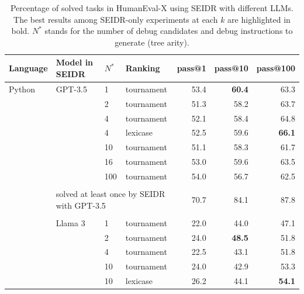 \begin{table}[t]
    \centering
    \caption{Percentage of solved tasks in HumanEval-X using SEIDR with different LLMs. The best results among SEIDR-only experiments at each $k$ are highlighted in bold. $N^*$ stands for the number of debug candidates and debug instructions to generate (tree arity).}\small
    \label{tab:generalizability-he}
\begin{tabular}{llllrrr}
\toprule
Language & Model in SEIDR & $N^*$ & Ranking &  pass@1 &  pass@10 &  pass@100 \\
\midrule
Python & GPT-3.5 & 1   &         tournament &    53.4 &     \textbf{60.4} &      63.3 \\
       &        & 2   &         tournament &    51.3 &     58.2 &      63.7 \\
       &        & 4   &         tournament &    52.1 &     58.4 &      64.8 \\
       &        & 4   &           lexicase &    52.5 &     59.6 &      \textbf{66.1} \\
       &        & 10  &         tournament &    51.1 &     58.3 &      61.7 \\
       &        & 16  &         tournament &    53.0 &     59.6 &      63.5 \\
       &        & 100 &         tournament &    54.0 &     56.7 &      62.5 \\[1pt]
\cline{3-7}\\[-8pt]
       & \multicolumn{3}{l}{solved at least once by SEIDR with GPT-3.5}   & 70.7 &     84.1 &      87.8 \\[1pt]
\cline{2-7}\\[-8pt]
    &   Llama 3 & 1   &         tournament &    22.0 &     44.0 &      47.1 \\
       &        & 2   &         tournament &    24.0 &     \textbf{48.5 }&      51.8 \\
       &        & 4   &         tournament &    22.5 &     43.1 &      51.8 \\
       &        & 10  &         tournament &    24.0 &     42.9 &      53.3 \\
       &        & 10  &           lexicase &    26.2 &     44.1 &      \textbf{54.1} \\

\end{tabular}
\end{table}
